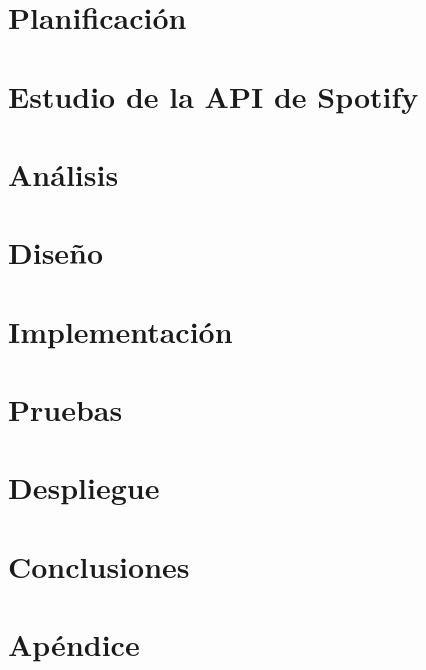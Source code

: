 \documentclass[a4paper, 11pt, oneside]{memoir}
\begin{document}
\chapter{Planificación} \label{ch:planificacion}

\cleardoublepage

\chapter{Estudio de la API de Spotify} \label{ch:estudioApiSpotify}

\cleardoublepage

\chapter{Análisis} \label{ch:analisis}

\cleardoublepage

\chapter{Diseño} \label{ch:diseño}

\cleardoublepage

\chapter{Implementación} \label{ch:implementacion}

\cleardoublepage

\chapter{Pruebas} \label{ch:pruebas}

\cleardoublepage

\chapter{Despliegue} \label{ch:despliegue}

\cleardoublepage

\chapter{Conclusiones} \label{ch:conclusiones}

\cleardoublepage


\backmatter
\appendix

\chapter{Apéndice} \label{ch:apendice}





\end{document}

